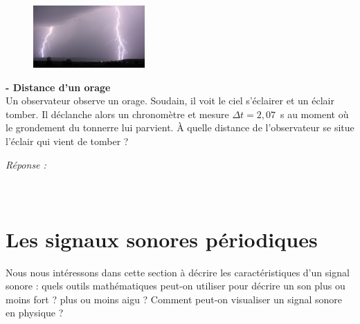 \begin{figure}
\vspace{-0.6cm}
    \centering
     \includegraphics[width=0.38\textwidth]{Images/Chapitre_3/Eclair.JPG}
   \end{figure}
\begin{mdframed}[style=autreexo]
\textbf{ - Distance d'un orage}\\
Un observateur observe un orage. Soudain, il voit le ciel s'éclairer et un éclair tomber. Il déclanche alors un chronomètre et mesure $\Delta t = 2,07$~s au moment où le grondement du tonnerre lui parvient. \`{A} quelle distance de l'observateur se situe l'éclair qui vient de tomber ?
\end{mdframed}
\textit{Réponse : } \\
\\
\\
\section{Les signaux sonores périodiques}
Nous nous intéressons dans cette section à décrire les caractéristiques d'un signal sonore : quels outils mathématiques peut-on utiliser pour décrire un son plus ou moins fort ? plus ou moins aigu ? Comment peut-on visualiser un signal sonore en physique ?
